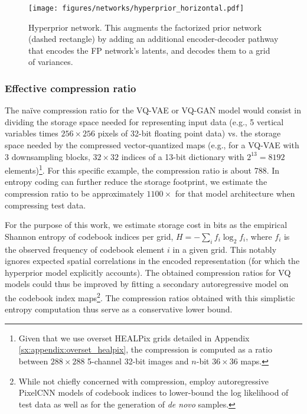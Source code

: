 \begin{figure}
    \centering
    \texttt{[image: figures/networks/hyperprior\_horizontal.pdf]}
    \caption{Hyperprior network. This augments the factorized prior network (dashed rectangle) by adding an additional encoder-decoder pathway that encodes the FP network's latents, and decodes them to a grid of variances.}
    \label{fig:hyperprior}
\end{figure}



\subsubsection{Effective compression ratio}

The na\"ive compression ratio for the VQ-VAE or VQ-GAN model would consist in dividing the storage space needed for representing input data (e.g., 5 vertical variables times $256 \times 256$ pixels of 32-bit floating point data) vs. the storage space needed by the compressed vector-quantized maps (e.g., for a VQ-VAE with 3 downsampling blocks, $32 \times 32$ indices of a 13-bit dictionary with $2^{13} = 8192$ elements)\footnote{Given that we use overset HEALPix grids detailed in Appendix \ref{sx:appendix:overset_healpix}, the compression is computed as a ratio between $288 \times 288$ 5-channel 32-bit images and $n$-bit $36 \times 36$ maps.}. For this specific example, the compression ratio is about 788. In entropy coding can further reduce the storage footprint, we estimate the compression ratio to be approximately $1100\times$ for that model architecture when compressing test data.

For the purpose of this work, we estimate storage cost in bits as the empirical Shannon entropy of codebook indices per grid, $H = -\sum_i f_i \log_2 f_i$, where $f_i$ is the observed frequency of codebook element $i$ in a given grid. 
This notably ignores expected spatial correlations in the encoded representation (for which the hyperprior model explicitly accounts). The obtained compression ratios for VQ models could thus be improved by fitting a secondary autoregressive model on the codebook index maps\footnote{While not chiefly concerned with compression, \cite{oord2017vqvae} employ autoregressive PixelCNN models of codebook indices to lower-bound the log likelihood of test data as well as for the generation of \emph{de novo} samples.}. The compression ratios obtained with this simplistic entropy computation thus serve as a conservative lower bound.


